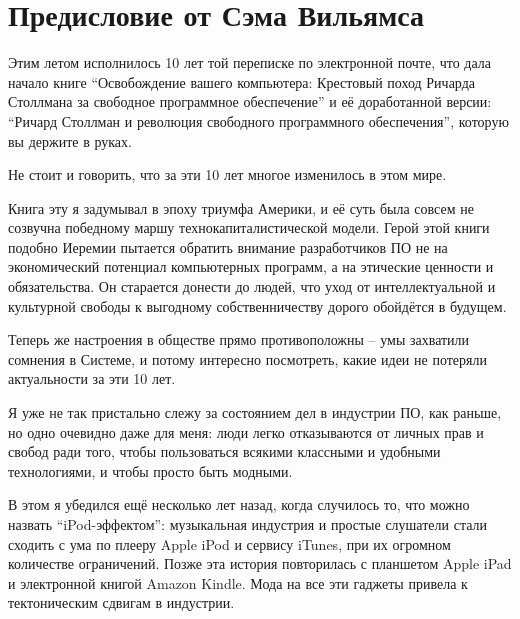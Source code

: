 
\chapter{Предисловие от Сэма Вильямса}

Этим летом исполнилось 10 лет той переписке по электронной почте,
что дала начало книге \enquote{Освобождение вашего компьютера: Крестовый
поход Ричарда Столлмана за свободное программное обеспечение} и её
доработанной версии: \enquote{Ричард Столлман и революция свободного
программного обеспечения}, которую вы держите в руках.

Не стоит и говорить, что за эти 10 лет многое изменилось в этом мире.

Книга эту я задумывал в эпоху триумфа Америки, и её суть была совсем
не созвучна победному маршу технокапиталистической модели.
Герой этой книги подобно Иеремии пытается обратить внимание
разработчиков ПО не на экономический потенциал компьютерных
программ, а на этические ценности и обязательства. Он старается донести
до людей, что уход от интеллектуальной и культурной свободы к
выгодному собственничеству дорого обойдётся в будущем.

Теперь же настроения в обществе прямо противоположны -- умы
захватили сомнения в Системе, и потому интересно посмотреть,
какие идеи не потеряли актуальности за эти 10 лет.

Я уже не так пристально слежу за состоянием дел в индустрии ПО,
как раньше, но одно очевидно даже для меня: люди легко отказываются
от личных прав и свобод ради того, чтобы пользоваться всякими
классными и удобными технологиями, и чтобы просто быть модными.

В этом я убедился ещё несколько лет назад, когда случилось то, что
можно назвать \enquote{iPod-эффектом}: музыкальная индустрия и простые
слушатели стали сходить с ума по плееру Apple iPod и сервису iTunes,
при их огромном количестве ограничений. Позже эта история повторилась
с планшетом Apple iPad и электронной книгой Amazon Kindle. Мода на
все эти гаджеты привела к тектоническим сдвигам в индустрии.

